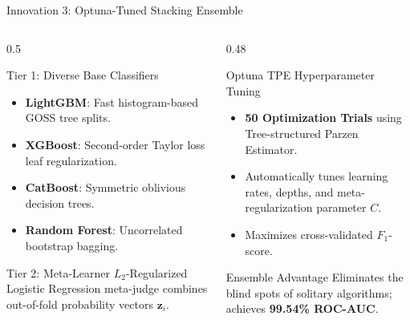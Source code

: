 \documentclass[aspectratio=169,10pt]{beamer}
\begin{document}
\begin{frame}{Innovation 3: Optuna-Tuned Stacking Ensemble}
    \begin{columns}[T]
        \begin{column}{0.5\textwidth}
            \begin{block}{Tier 1: Diverse Base Classifiers}
                \begin{itemize}
                    \item \textbf{LightGBM}: Fast histogram-based GOSS tree splits.
                    \item \textbf{XGBoost}: Second-order Taylor loss leaf regularization.
                    \item \textbf{CatBoost}: Symmetric oblivious decision trees.
                    \item \textbf{Random Forest}: Uncorrelated bootstrap bagging.
                \end{itemize}
            \end{block}
            \begin{exampleblock}{Tier 2: Meta-Learner}
                $L_2$-Regularized Logistic Regression meta-judge combines out-of-fold probability vectors $\mathbf{z}_i$.
            \end{exampleblock}
        \end{column}
        
        \begin{column}{0.48\textwidth}
            \begin{block}{Optuna TPE Hyperparameter Tuning}
                \begin{itemize}
                    \item \textbf{50 Optimization Trials} using Tree-structured Parzen Estimator.
                    \item Automatically tunes learning rates, depths, and meta-regularization parameter $C$.
                    \item Maximizes cross-validated $F_1$-score.
                \end{itemize}
            \end{block}
            \begin{alertblock}{Ensemble Advantage}
                Eliminates the blind spots of solitary algorithms; achieves \textbf{99.54\% ROC-AUC}.
            \end{alertblock}
        \end{column}
    \end{columns}
\end{frame}
\end{document}
